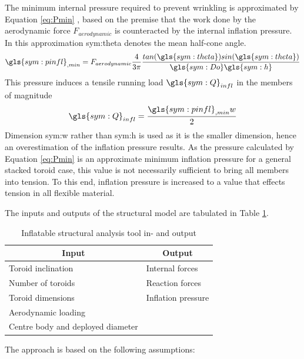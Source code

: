 The minimum internal pressure required to prevent wrinkling is approximated by Equation \ref{eq:Pmin} \cite{Brown2009, Samareh2011}, based on the premise that the work done by the aerodynamic force $F_{aerodynamic}$ is counteracted by the internal inflation pressure. In this approximation \gls{sym:theta} denotes the mean half-cone angle.
\begin{equation}
\label{eq:Pmin}
\gls{sym:pinfl}_{,min} = F_{aerodynamic} \frac{4}{3 \pi} \frac{tan(\gls{sym:theta})sin(\gls{sym:theta}) }{\gls{sym:Do}\gls{sym:h}}
\end{equation}
This pressure induces a tensile running load $\gls{sym:Q}_{infl}$ in the members of magnitude \cite{Megson2012}
\begin{equation}
\label{eq:Q}
\gls{sym:Q}_{infl} =\frac{\gls{sym:pinfl}_{,min}w}{2}
\end{equation}
Dimension \gls{sym:w} rather than \gls{sym:h} is used as it is the smaller dimension, hence an overestimation of the inflation pressure results. As the pressure calculated by Equation \ref{eq:Pmin} is an approximate minimum inflation pressure for a general stacked toroid case, this value is not necessarily sufficient to bring all members into tension. To this end, inflation pressure is increased to a value that effects tension in all flexible material.

The inputs and outputs of the structural model are tabulated in Table \ref{tab:infl}.
\begin{table}[ht]
\caption{Inflatable structural analysis tool in- and output}
\centering
\begin{tabular}{|l||l|}
\hline
\multicolumn{1}{|c||}{{\bf Input}} & \multicolumn{1}{c|}{{\bf Output}} \\ \hline \hline
Toroid inclination                & Internal forces                   \\ \hline
Number of toroids                 & Reaction forces                   \\ \hline
Toroid dimensions                 & Inflation pressure                \\ \hline
Aerodynamic loading               &                                   \\ \hline
Centre body and deployed diameter  &                                   \\ \hline
\end{tabular}
\label{tab:infl}
\end{table}

The approach is based on the following assumptions:

